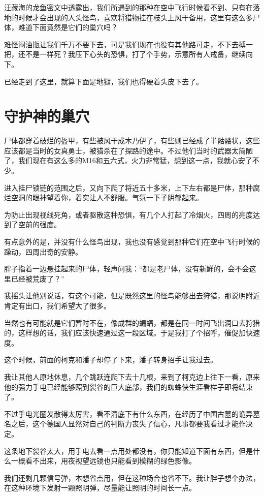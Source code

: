 汪藏海的龙鱼密文中透露出，我们所遇到的那种在空中飞行时候看不到、只有在落地的时候才会出现的人头怪鸟，喜欢将猎物挂在枝头上风干备用，这里有这么多尸体，难道下面竟然是它们的巢穴吗？

难怪闷油瓶让我们千万不要下去，可是我们现在也役有其他路可走，不下去搏一把，还不是一样死？我压下心头的恐惧，打了个手势，示意所有人戒备，继续向下。

已经走到了这里，就算下面是地狱，我们也得硬着头皮下去了。

\chapter{守护神的巢穴}

尸体都穿着破烂的盔甲，有些被风干成木乃伊了，有些则已经成了半骷髅状，这些应该都是当时的女真勇士，被猎杀在了探路的途中。不过他们当时的武器太简陋了，我们现在有这么多的M16和五六式，火力非常猛，想到这一点，我就心安了不少。

进入挂尸锁链的范围之后，又向下爬了将近五十多米，上下左右都是尸体，那种腐烂空洞的眼神望着你，着实让人不舒服。气氛一下子阴郁起来。

为防止出现视线死角，或者驱散这种恐惧，有几个人打起了冷烟火，四周的亮度达到了空前的强度。

有点意外的是，并没有什么怪鸟出现，我也没有感觉到那种它们在空中飞行时候的躁动，四周出奇的安静。

胖子指着一边悬挂起来的尸体，轻声问我：“都是老尸体，没有新鲜的，会不会这里已经被荒废了？”

我摇头让他别说话，有这个可能，但是既然这里的怪鸟能够出去狩猎，那说明附近肯定有出口，我们希望大了很多。

当然也有可能就是它们暂时不在，像成群的蝙蝠，都是在同一时间飞出洞口去狩猎的，这样想的话，我们应该快速通过这一段区域。于是我打了个招呼，催促加快速度。

这个时候，前面的柯克和潘子却停了下来，潘子转身招手让我过去。

我让其他人原地休息，几个跳跃连爬下去十几根，来到了柯克边上往下一看，原来他的强力手电已经能够照到裂谷的巨大底部，我们的蜘蛛侠生涯看样子即将结束了。

不过手电光圈发散得太厉害，看不清底下有什么东西，在经历了中国古墓的诡异墓名之后，这个德国人显然对自己的判断力丧失了信心，凡事都要我看过才能作决定。

这条地下裂谷太大，用手电去看一点用处都没有，你只能知道下面有东西，但是什么一概看不出来，用夜视望远镜也只能看到模糊的绿色影像。

我们还剩几颗信号弹，本想省点用，但在这种场合也省不下。我让胖子想个办法，在这种环境下发射一颗照明弹，尽量能让照明的时间长一点。

